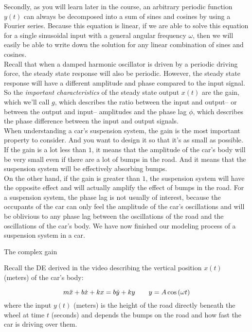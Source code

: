 Secondly, as you will learn later in the course,
an arbitrary periodic function $y(t)$ can always be decomposed into a sum of sines and cosines
by using a Fourier series.
Because this equation is linear, if we are able to solve this equation for a single sinusoidal input
with a general angular frequency $\omega$, then we will easily be able to write down
the solution for any linear combination of sines
and cosines.\\

Recall that when a damped harmonic oscillator is driven
by a periodic driving force, the steady state response will also
be periodic.
However, the steady state response will have a different amplitude and phase
compared to the input signal.\\
So the \emph{important characteristics} of the steady state output
$x(t)$ are the gain, which we'll call $g$,
which describes the ratio between the input and output--
or between the output and input-- amplitudes
and the phase lag $\phi$, which describes
the phase difference between the input and output signals.\\
When understanding a car's suspension system,
the gain is the most important property to consider.
And you want to design it so that it's as small as possible.
If the gain is a lot less than $1$,
it means that the amplitude of the car's body will be very small even if there are a lot of bumps in the road.
And it means that the suspension system will
be effectively absorbing bumps.\\
On the other hand, if the gain is greater than $1$,
the suspension system will have the opposite effect
and will actually amplify the effect of bumps in the road.
For a suspension system, the phase lag is not usually of interest, because the occupants
of the car can only feel the amplitude of the car's oscillations and will be oblivious to any phase
lag between the oscillations of the road and the oscillations of the car's body.
We have now finished our modeling process of a suspension system in a car.
\clearpage

\begin{problem}
  The complex gain
\end{problem}

Recall the DE derived in the video describing the vertical position $x(t)$ (meters)
of the car's body:

\begin{equation*}
  \displaystyle  \displaystyle m\ddot{x}+b\dot{x}+kx=b\dot{y}+ky\qquad
  y=A \cos \left(\omega t\right)
\end{equation*}
where the input $y(t)$ (meters) is the height of the road directly beneath the wheel at time $t$ (seconds)
and depends the bumps on the road and how fast the car is driving over them.\\

